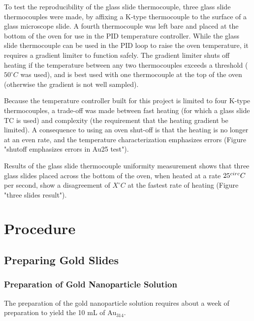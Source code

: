 \documentclass[12pt,oneside,english]{article}
\begin{document}
	To test the reproducibility of the glass slide thermocouple, three glass slide thermocouples were made, by affixing a K-type thermocouple to the surface of a glass microscope slide.
	A fourth thermocouple was left bare and placed at the bottom of the oven for use in the PID temperature controller.
	While the glass slide thermocouple can be used in the PID loop to raise the oven temperature, it requires a gradient limiter to function safely.  
	The gradient limiter shuts off heating if the temperature between any two thermocouples exceeds a threshold ($50^{\circ}C$ was used), and is best used with one thermocouple at the top of the oven (otherwise the gradient is not well sampled).

	Because the temperature controller built for this project is limited to four K-type thermocouples, a trade-off was made between fast heating (for which a glass slide TC is used) and complexity (the requirement that the heating gradient be limited). 
	A consequence to using an oven shut-off is that the heating is no longer at an even rate, and the temperature characterization emphasizes errors (Figure "shutoff emphasizes errors in Au25 test").

	Results of the glass slide thermocouple uniformity measurement shows that three glass slides placed across the bottom of the oven, when heated at a rate $25^{\/circ}C$ per second, show a disagreement of $X^{\circ}C$ at the fastest rate of heating (Figure "three slides result").

	\clearpage
	
	\section{Procedure}	

	\subsection{Preparing Gold Slides}
	
	\subsubsection{Preparation of Gold Nanoparticle Solution}
	The preparation of the gold nanoparticle solution requires about a week of preparation to yield the 10 mL of Au$_{314}$.
	
\end{document}
